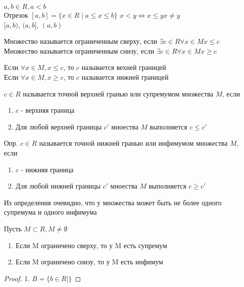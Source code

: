 $ a, b \in R, a < b $ \\
Отрезок $ [a, b] = \{ x \in R \mid a \leq x \leq b \} $
$ x < y \Leftrightarrow x \leq y x \neq y $ \\
$ [a, b) $,
$ (a, b] $,
$ (a, b) $\\
\begin{definition}
	Множество называется ограниченным сверху, если $ \exists c \in R \forall x \in M x \leq c $ \\
	Множество называется ограниченным снизу, если $ \exists c \in R \forall x \in M x \geq c $ 
\end{definition}

\begin{definition}
	Если $ \forall x \in M, x \leq c$, то $c$ называется вехней границей \\
	Если $ \forall x \in M, x \geq c$, то $c$ называется нижней границей 
\end{definition}
\begin{definition}
	$ c \in R $ называется точной верхней гранью или супремумом множества $M$, если
	\begin{enumerate}
		\item $c$ - верхняя граница
		\item Для любой верхней границы $c'$ мноества $M$ выполняется $ c \leq c'$
	\end{enumerate}
\end{definition}
\begin{definition}
Опр. $ c \in R $ называется точной нижней гранью или инфимумом множества $M$, если 
\begin{enumerate}
	\item $c$ - нижняя граница
	\item Для любой нижней границы $c'$ мноества $M$ выполняется $ c \geq c'$ 
\end{enumerate}
\end{definition}
Из определения очевидно, что у множества может быть не более одного супремума и одного инфимума 
\begin{theorem}
	Пусть $ M \subset R, M \neq \emptyset $ 
	\begin{enumerate}
		\item Если M ограничено сверху, то у M есть супремум
		\item Если M ограничено снизу, то у M есть инфимум

	\end{enumerate}
	\begin{proof}
		1. $ B = \{ b \in R \mid  \} $
	\end{proof}
\end{theorem}

